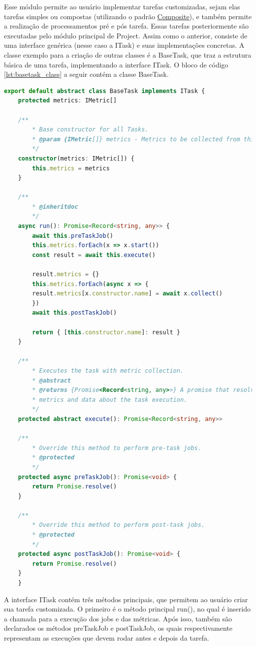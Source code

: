 \documentclass[12pt]{tcc}
\begin{document}
	Esse módulo permite ao usuário implementar tarefas customizadas, sejam elas tarefas simples ou compostas (utilizando o padrão \hyperref[subsection:composite]{Composite}), e também permite a realização de processamentos pré e pós tarefa. Essas tarefas posteriormente são executadas pelo módulo principal de Project.
	Assim como o anterior, consiste de uma interface genérica (nesse caso a ITask) e suas implementações concretas. A classe exemplo para a criação de outras classes é a BaseTask, que traz a estrutura básica de uma tarefa, implementando a interface ITask. O bloco de código \ref{lst:basetask_class} a seguir contém a classe BaseTask.

	\begin{lstlisting}[label={lst:basetask_class}, caption={Implementação da classe responsável por representar uma tarefa básica.}, language=TypeScript, breaklines=true]
	export default abstract class BaseTask implements ITask {
	protected metrics: IMetric[]

	/**
		* Base constructor for all Tasks.
		* @param {IMetric[]} metrics - Metrics to be collected from this task.
		*/
	constructor(metrics: IMetric[]) {
		this.metrics = metrics
	}

	/**
		* @inheritdoc
		*/
	async run(): Promise<Record<string, any>> {
		await this.preTaskJob()
		this.metrics.forEach(x => x.start())
		const result = await this.execute()

		result.metrics = {}
		this.metrics.forEach(async x => {
		result.metrics[x.constructor.name] = await x.collect()
		})
		await this.postTaskJob()

		return { [this.constructor.name]: result }
	}

	/**
		* Executes the task with metric collection.
		* @abstract
		* @returns {Promise<Record<string, any>>} A promise that resolves with a report containing
		* metrics and data about the task execution.
		*/
	protected abstract execute(): Promise<Record<string, any>>

	/**
		* Override this method to perform pre-task jobs.
		* @protected
		*/
	protected async preTaskJob(): Promise<void> {
		return Promise.resolve()
	}

	/**
		* Override this method to perform post-task jobs.
		* @protected
		*/
	protected async postTaskJob(): Promise<void> {
		return Promise.resolve()
	}
	}
	\end{lstlisting}

	A interface ITask contém três métodos principais, que permitem ao usuário criar sua tarefa customizada. O primeiro é o método principal run(), no qual é inserido a chamada para a execução dos jobs e das métricas. Após isso, também são declarados os métodos preTaskJob e postTaskJob, os quais respectivamente representam as execuções que devem rodar antes e depois da tarefa.
\end{document}
